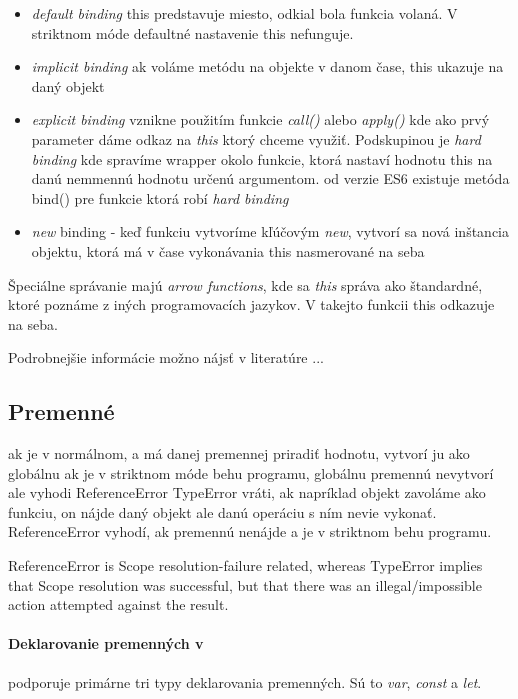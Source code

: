 \begin{itemize}
  \item \emph{default binding} this predstavuje miesto, odkial bola funkcia volaná. V striktnom móde defaultné nastavenie this nefunguje.%
  \item \emph{implicit binding} ak voláme metódu na objekte v danom čase, this ukazuje na daný objekt
  \item \emph{explicit binding} vznikne použitím funkcie \emph{call()} alebo \emph{apply()} kde ako prvý parameter dáme odkaz na \emph{this} ktorý chceme využiť. Podskupinou je \emph{hard binding} kde spravíme wrapper okolo funkcie, ktorá nastaví hodnotu this na danú nemmennú hodnotu určenú argumentom. od verzie ES6 existuje metóda bind() pre funkcie ktorá robí \emph{hard binding}
  \item \emph{new} binding - keď funkciu vytvoríme kľúčovým \emph{new}, vytvorí sa nová inštancia objektu, ktorá má v čase vykonávania this nasmerované na seba
\end{itemize}

Špeciálne správanie majú \emph{arrow functions}, kde sa \emph{this} správa ako štandardné, ktoré poznáme z iných programovacích jazykov. V takejto funkcii this odkazuje na seba.

Podrobnejšie informácie možno nájsť v literatúre ...%

\subsection{Premenné}
\TODO
ak je v normálnom, a má danej premennej priradiť hodnotu, vytvorí ju ako globálnu
ak je v striktnom móde behu programu, globálnu premennú nevytvorí ale vyhodi ReferenceError
TypeError vráti, ak napríklad objekt zavoláme ako funkciu, on nájde daný objekt ale danú operáciu s ním nevie vykonať. ReferenceError vyhodí, ak premennú nenájde a je v striktnom behu programu.

ReferenceError is Scope resolution-failure related, whereas TypeError implies that Scope resolution was successful, but that there was an illegal/impossible action attempted against the result.

\paragraph{Deklarovanie premenných v \JS{}}
\JS{} podporuje primárne tri typy deklarovania premenných. Sú to \emph{var}, \emph{const} a \emph{let}. 

